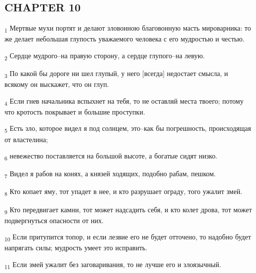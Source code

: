 \subsection{CHAPTER 10}
\begin{tcolorbox}
\textsubscript{1} Мертвые мухи портят и делают зловонною благовонную масть мироварника: то же делает небольшая глупость уважаемого человека с его мудростью и честью.
\end{tcolorbox}
\begin{tcolorbox}
\textsubscript{2} Сердце мудрого--на правую сторону, а сердце глупого--на левую.
\end{tcolorbox}
\begin{tcolorbox}
\textsubscript{3} По какой бы дороге ни шел глупый, у него [всегда] недостает смысла, и всякому он выскажет, что он глуп.
\end{tcolorbox}
\begin{tcolorbox}
\textsubscript{4} Если гнев начальника вспыхнет на тебя, то не оставляй места твоего; потому что кротость покрывает и большие проступки.
\end{tcolorbox}
\begin{tcolorbox}
\textsubscript{5} Есть зло, которое видел я под солнцем, это--как бы погрешность, происходящая от властелина;
\end{tcolorbox}
\begin{tcolorbox}
\textsubscript{6} невежество поставляется на большой высоте, а богатые сидят низко.
\end{tcolorbox}
\begin{tcolorbox}
\textsubscript{7} Видел я рабов на конях, а князей ходящих, подобно рабам, пешком.
\end{tcolorbox}
\begin{tcolorbox}
\textsubscript{8} Кто копает яму, тот упадет в нее, и кто разрушает ограду, того ужалит змей.
\end{tcolorbox}
\begin{tcolorbox}
\textsubscript{9} Кто передвигает камни, тот может надсадить себя, и кто колет дрова, тот может подвергнуться опасности от них.
\end{tcolorbox}
\begin{tcolorbox}
\textsubscript{10} Если притупится топор, и если лезвие его не будет отточено, то надобно будет напрягать силы; мудрость умеет это исправить.
\end{tcolorbox}
\begin{tcolorbox}
\textsubscript{11} Если змей ужалит без заговаривания, то не лучше его и злоязычный.
\end{tcolorbox}
